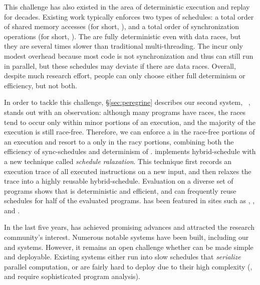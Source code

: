  This challenge has also existed in the area of deterministic
execution and replay for decades. Existing work typically enforces two types of
schedules: a total order of shared memory accesses (for short, \memsched), and a
total order of synchronization operations (for 
short, \syncsched). The \memscheds are fully deterministic even with 
data races, but they are several times slower than traditional multi-threading.
The \syncscheds incur only modest overhead because most code is 
not synchronization and thus can still run in parallel, but these schedules may
deviate if there are data races. Overall, despite much research effort, people
can only choose either full determinism or efficiency, but not both.

In order to tackle this challenge,  \S\ref{sec:peregrine} describes our second
\smt system, \peregrine~\cite{peregrine:sosp11}, 
stands out with an observation: although many programs have races, the 
races tend to occur only within minor portions of an execution, and the 
majority of the execution is still race-free. Therefore, we can enforce a
\syncscheds
in the race-free portions of an execution and resort to a \memsched only in the
racy portions,
combining both the efficiency of sync-schedules and determinism of \memscheds. 
\peregrine implements hybrid-schedule with
a new technique called \emph{schedule ralaxation}. This technique first records
an execution 
trace of all executed instructions on a new input, and then relaxes 
the trace into a highly reusable hybrid-schedule. Evaluation on a diverse set of
programs shows that 
\peregrine is deterministic and efficient, and can frequently reuse schedules 
for half of the evaluated programs. \peregrine has been featured in sites such 
as \acmtechnews, \tgdaily, and \physorg.

 In the last five
years, \smt has achieved promising advances and attracted the research
community's interest. Numerous notable \smt systems have been built, including
our \tern and 
\peregrine systems. However, it remains an open challenge whether
\smt can be made simple and deployable. Existing \smt systems either run into
slow schedules that
\emph{serialize} parallel computation, or are fairly hard to deploy
due to their high complexity (\eg, \tern and \peregrine require sophisticated
program analysis).

